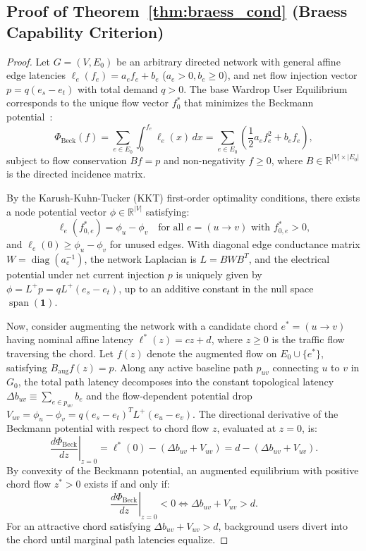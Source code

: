\documentclass[11pt,a4paper]{article}
\begin{document}
\subsection{Proof of Theorem~\ref{thm:braess_cond} (Braess Capability Criterion)}
\label{subsec:proof_thm1}

\begin{proof}
Let $G = (V, E_0)$ be an arbitrary directed network with general affine edge latencies $\ell_e(f_e) = a_e f_e + b_e$ ($a_e > 0, b_e \ge 0$), and net flow injection vector $p = q (e_s - e_t)$ with total demand $q > 0$. The base Wardrop User Equilibrium corresponds to the unique flow vector $f_0^*$ that minimizes the Beckmann potential~\cite{beckmann1956studies}:
\begin{equation}
\Phi_{\text{Beck}}(f) = \sum_{e \in E_0} \int_0^{f_e} \ell_e(x) \, dx = \sum_{e \in E_0} \left( \frac{1}{2} a_e f_e^2 + b_e f_e \right),
\end{equation}
subject to flow conservation $B f = p$ and non-negativity $f \ge 0$, where $B \in \mathbb{R}^{|V| \times |E_0|}$ is the directed incidence matrix.

By the Karush-Kuhn-Tucker (KKT) first-order optimality conditions, there exists a node potential vector $\phi \in \mathbb{R}^{|V|}$ satisfying:
\begin{equation}
\ell_e(f_{0, e}^*) = \phi_u - \phi_v \quad \text{for all } e = (u \to v) \text{ with } f_{0, e}^* > 0,
\end{equation}
and $\ell_e(0) \ge \phi_u - \phi_v$ for unused edges. With diagonal edge conductance matrix $W = \operatorname{diag}(a_e^{-1})$, the network Laplacian is $L = B W B^T$, and the electrical potential under net current injection $p$ is uniquely given by $\phi = L^+ p = q L^+ (e_s - e_t)$, up to an additive constant in the null space $\operatorname{span}(\mathbf{1})$.

Now, consider augmenting the network with a candidate chord $e^* = (u \to v)$ having nominal affine latency $\ell^*(z) = c z + d$, where $z \ge 0$ is the traffic flow traversing the chord. Let $f(z)$ denote the augmented flow on $E_0 \cup \{e^*\}$, satisfying $B_{\text{aug}} f(z) = p$. Along any active baseline path $p_{uv}$ connecting $u$ to $v$ in $G_0$, the total path latency decomposes into the constant topological latency $\Delta b_{uv} \equiv \sum_{e \in p_{uv}} b_e$ and the flow-dependent potential drop $V_{uv} = \phi_u - \phi_v = q (e_s - e_t)^T L^+ (e_u - e_v)$. The directional derivative of the Beckmann potential with respect to chord flow $z$, evaluated at $z = 0$, is:
\begin{equation}
\left. \frac{d \Phi_{\text{Beck}}}{dz} \right|_{z=0} = \ell^*(0) - (\Delta b_{uv} + V_{uv}) = d - (\Delta b_{uv} + V_{uv}).
\end{equation}
By convexity of the Beckmann potential, an augmented equilibrium with positive chord flow $z^* > 0$ exists if and only if:
\begin{equation}
\left. \frac{d \Phi_{\text{Beck}}}{dz} \right|_{z=0} < 0 \iff \Delta b_{uv} + V_{uv} > d.
\end{equation}
For an attractive chord satisfying $\Delta b_{uv} + V_{uv} > d$, background users divert into the chord until marginal path latencies equalize.


\end{proof}
\end{document}
